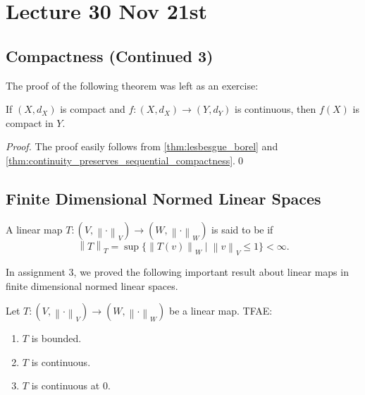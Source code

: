 \documentclass[notoc,notitlepage]{tufte-book}
\newcommand{\norm}[1]{\left\| #1 \right\|}
\begin{document}

\chapter{Lecture 30 Nov 21st}%
\label{chp:lecture_30_nov_21st}

\section{Compactness (Continued 3)}%
\label{sec:compactness_continued_3}

The proof of the following theorem was left as an exercise:

\begin{thm}\label{thm:continuity_preserves_compactness}
  If $(X, d_X)$ is compact and $f : (X, d_X) \to (Y, d_Y)$ is continuous, then $f(X)$ is compact in $Y$.
\end{thm}

\begin{proof}
  The proof easily follows from \cref{thm:lesbesgue_borel} and \cref{thm:continuity_preserves_sequential_compactness}.\qed\
\end{proof}


\section{Finite Dimensional Normed Linear Spaces}%
\label{sec:finite_dimensional_normed_linear_spaces}

\begin{defn}[Bounded Linear Map]\label{defn:bounded_linear_map}
  A linear map $T : (V, \norm\cdot_V) \to (W, \norm\cdot_W)$ is said to be  if
  \begin{equation*}
    \norm{T}_T = \sup \{ \norm{T(v)}_W \mid \norm{v}_V \leq 1 \} < \infty.
  \end{equation*}
\end{defn}

In assignment 3, we proved the following important result about linear maps in finite dimensional normed linear spaces.

\begin{thm}\label{thm:boundedness_is_equivalent_to_continuity_in_finite_dimensional_normed_linear_spaces}
  Let $T : ( V, \norm\cdot_V ) \to (W, \norm\cdot_W)$ be a linear map. TFAE:
  \begin{enumerate}
    \item $T$ is bounded.
    \item $T$ is continuous.
    \item $T$ is continuous at $0$.
  \end{enumerate}
\end{thm}
\end{document}
